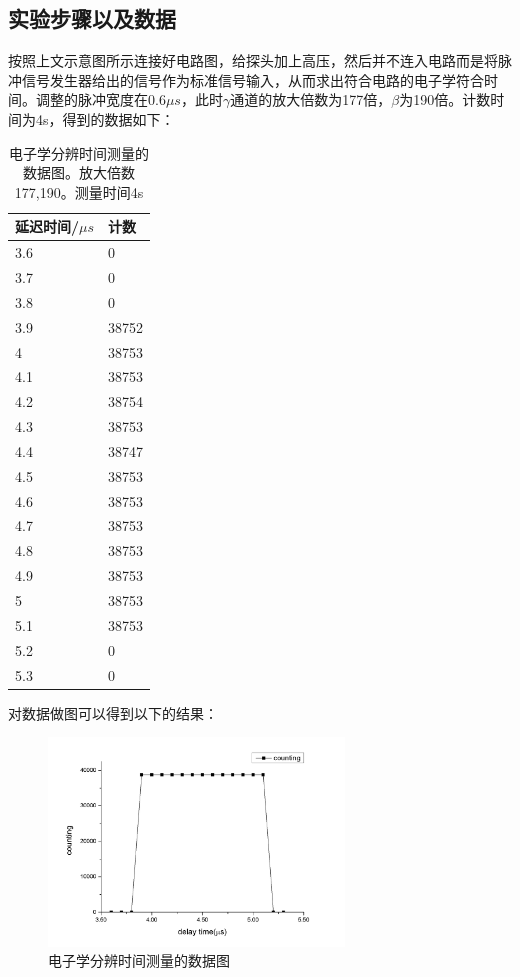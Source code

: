 \documentclass[aps,pre,12pt,preprint,onecolumn,showpacs,showkeys,UTF8]{revtex4-1}
\begin{document}
\subsection{实验步骤以及数据}

按照上文示意图所示连接好电路图，给探头加上高压，然后并不连入电路而是将脉冲信号发生器给出的信号作为标准信号输入，从而求出符合电路的电子学符合时间。调整的脉冲宽度在$0.6\mu s$，此时$\gamma$通道的放大倍数为177倍，$\beta$为190倍。计数时间为4s，得到的数据如下：
\begin{center}
	\begin{table}[h]
		\caption{电子学分辨时间测量的数据图。放大倍数177,190。测量时间4s}
		\begin{tabularx}{6cm}{XX}
			\hline
			\hline
			延迟时间/$\mu s$&计数\\
			\hline
3.6	&	0	\\
3.7	&	0	\\
3.8	&	0	\\
3.9	&	38752	\\
4	&	38753	\\
4.1	&	38753	\\
4.2	&	38754	\\
4.3	&	38753	\\
4.4	&	38747	\\
4.5	&	38753	\\
4.6	&	38753	\\
4.7	&	38753	\\
4.8	&	38753	\\
4.9	&	38753	\\
5	&	38753	\\
5.1	&	38753	\\
5.2	&	0	\\
5.3	&	0	\\

			\hline
			\hline
		\end{tabularx}
	\end{table}
\end{center}
对数据做图可以得到以下的结果：
\begin{figure}[h]
	\begin{center}
		\includegraphics[width=0.7\textwidth]{pic2.png}
		\caption{\label{fig:exp1}电子学分辨时间测量的数据图}
	\end{center}
\end{figure}
\end{document}
